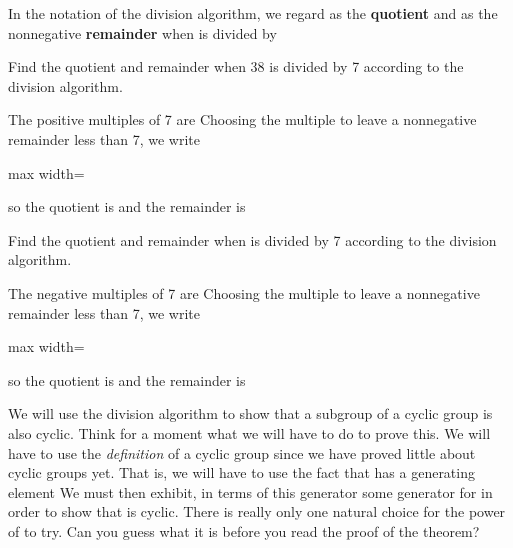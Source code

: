 \documentclass[11pt,oneside]{article}
\begin{document}
\begin{BookBody}
In the notation of the division algorithm, we regard  as the\textbf{ quotient} and  as the nonnegative\textbf{ remainder} when  is divided by 

 Find the quotient  and remainder  when 38 is divided by 7 according to the division algorithm.

 The positive multiples of 7 are  Choosing the multiple to leave a nonnegative remainder less than 7, we write

\begin{center}\begin{adjustbox}{max width=\linewidth}\end{adjustbox}\end{center}

\noindent so the quotient is  and the remainder is  \BookEnd{\blacktriangle}

 Find the quotient  and remainder  when  is divided by 7 according to the division algorithm.

 The negative multiples of 7 are  Choosing the multiple to leave a nonnegative remainder less than 7, we write

\begin{center}\begin{adjustbox}{max width=\linewidth}\end{adjustbox}\end{center}

\noindent so the quotient is  and the remainder is  \BookEnd{\blacktriangle}

We will use the division algorithm to show that a subgroup  of a cyclic group  is also cyclic. Think for a moment what we will have to do to prove this. We will have to use the\textit{ definition} of a cyclic group since we have proved little about cyclic groups yet. That is, we will have to use the fact that  has a generating element  We must then exhibit, in terms of this generator  some generator  for  in order to show that  is cyclic. There is really only one natural choice for the power  of  to try. Can you guess what it is before you read the proof of the theorem?

\end{BookBody}
\end{document}
